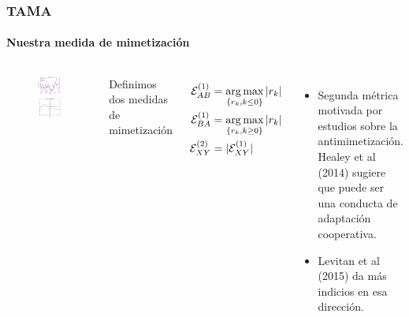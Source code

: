 \begin{frame}
\frametitle{TAMA}
\framesubtitle{Nuestra medida de mimetización}

  \begin{columns}
    \begin{figure}[t]
      \includegraphics[scale=0.33]{images/time_plot.png}

      \includegraphics[scale=0.33]{images/cross_correlogram_2.png}
    \end{figure}


    Definimos dos medidas de mimetización

    \begin{align*}
      \mathcal{E}_{AB}^{(1)} &= \operatorname*{arg\,max}_{\{r_k, k \leq 0\}} |r_k|  \\
      \mathcal{E}_{BA}^{(1)} &= \operatorname*{arg\,max}_{\{r_k, k \geq 0\}} |r_k|  \\
      \mathcal{E}_{XY}^{(2)} &= |\mathcal{E}_{XY}^{(1)}|
    \end{align*}

    \begin{itemize}
      \item  Segunda métrica motivada por estudios sobre la antimimetización. Healey et al (2014) sugiere que puede ser una conducta de adaptación cooperativa.
      \item  Levitan et al (2015) da más indicios en esa dirección.
    \end{itemize}

  \end{columns}
\end{frame}

